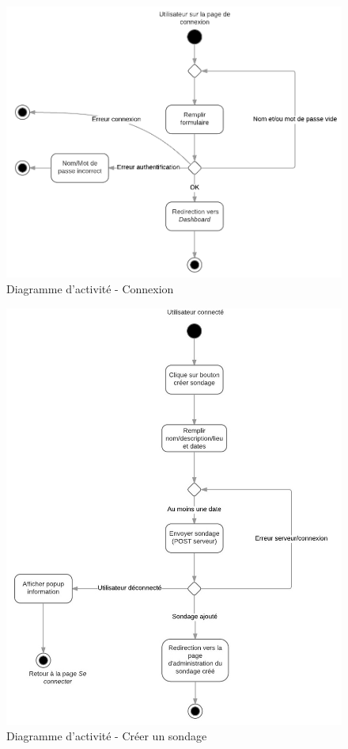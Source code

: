 \documentclass[titlepage]{report}
\begin{document}
\begin{figure}[h]
	\caption{Diagramme d'activité - Connexion}
	\label{annexe_diagramme_activite_connexion}
	\centering
	\includegraphics[width=\textwidth]{figures/diagrammes/activite_connexion.png}
\end{figure}

\begin{figure}[h]
	\caption{Diagramme d'activité - Créer un sondage}
	\label{annexe_diagramme_activite_creerSondage}
	\centering
	\includegraphics[scale=1]{figures/diagrammes/activite_creerSondage.png}
\end{figure}
\end{document}
